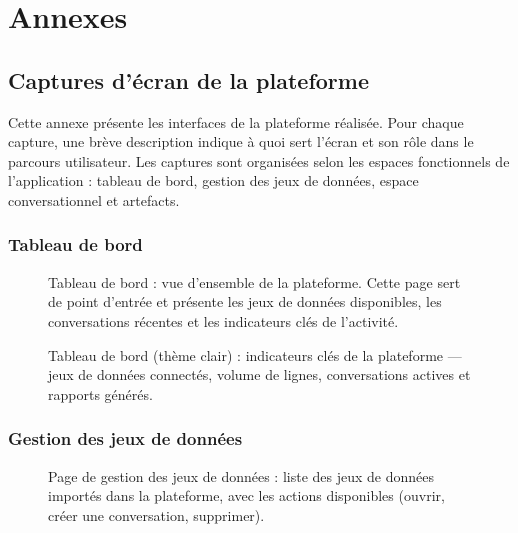 \chapter{Annexes}

\section{Captures d'écran de la plateforme}

Cette annexe présente les interfaces de la plateforme réalisée. Pour chaque capture, une brève description indique à quoi sert l'écran et son rôle dans le parcours utilisateur. Les captures sont organisées selon les espaces fonctionnels de l'application : tableau de bord, gestion des jeux de données, espace conversationnel et artefacts.

\subsection{Tableau de bord}

\begin{figure}[H]
\centering
{}
\caption{Tableau de bord : vue d'ensemble de la plateforme. Cette page sert de point d'entrée et présente les jeux de données disponibles, les conversations récentes et les indicateurs clés de l'activité.}
\label{fig:annexe-dashboard}
\end{figure}

\begin{figure}[H]
\centering
{}
\caption{Tableau de bord (thème clair) : indicateurs clés de la plateforme — jeux de données connectés, volume de lignes, conversations actives et rapports générés.}
\label{fig:annexe-dashboard-white}
\end{figure}

\subsection{Gestion des jeux de données}

\begin{figure}[H]
\centering
{}
\caption{Page de gestion des jeux de données : liste des jeux de données importés dans la plateforme, avec les actions disponibles (ouvrir, créer une conversation, supprimer).}
\label{fig:annexe-datasets-list}
\end{figure}

